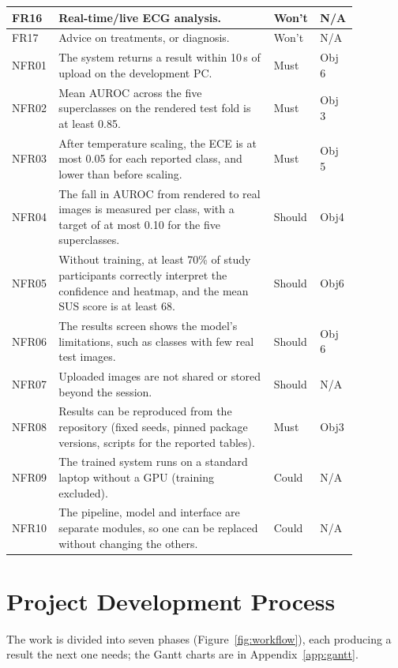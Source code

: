 \begin{table}[!htbp]
\begin{tabular}{|p{0.08\linewidth}|p{0.60\linewidth}|p{0.105\linewidth}|p{0.085\linewidth}|}
    \hline
    FR16 & Real-time/live ECG analysis. & Won't & N/A \\ %
    \hline
    FR17 & Advice on treatments, or diagnosis. & Won't & N/A \\
    \hline
    NFR01 & The system returns a result within 10\,s of upload on the development PC. & Must & Obj 6 \\
    \hline
    NFR02 & Mean AUROC across the five superclasses on the rendered test fold is at least 0.85. & Must & Obj 3 \\
    \hline
    NFR03 & After temperature scaling, the ECE is at most 0.05 for each reported class, and lower than before scaling. & Must & Obj 5 \\
    \hline
    NFR04 & The fall in AUROC from rendered to real images is measured per class, with a target of at most 0.10 for the five superclasses. & Should & Obj4 \\
    \hline
    NFR05 & Without training, at least 70\% of study participants correctly interpret the confidence and heatmap, and the mean SUS score is at least 68. & Should & Obj6 \\
    \hline
    NFR06 & The results screen shows the model's limitations, such as classes with few real test images. & Should & Obj 6 \\
    \hline
    NFR07 & Uploaded images are not shared or stored beyond the session. & Should & N/A \\
    \hline
    NFR08 & Results can be reproduced from the repository (fixed seeds, pinned package versions, scripts for the reported tables). & Must & Obj3 \\
    \hline
    NFR09 & The trained system runs on a standard laptop without a GPU (training excluded). & Could & N/A \\
    \hline
    NFR10 & The pipeline, model and interface are separate modules, so one can be replaced without changing the others. & Could & N/A \\
    \hline
  \end{tabular}
\end{table}

\section{Project Development Process}
\label{sec:dev-plan}

The work is divided into seven phases (Figure~\ref{fig:workflow}), each producing a result the next one needs; the Gantt charts are in Appendix~\ref{app:gantt}.

